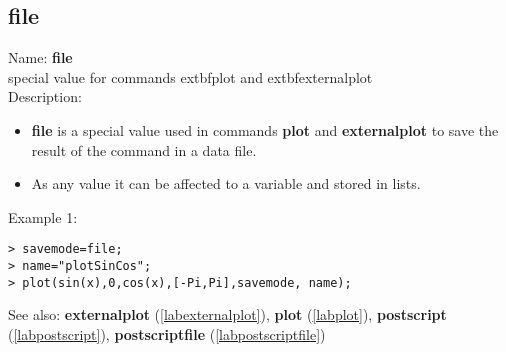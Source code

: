 \subsection{file}
\label{labfile}
\noindent Name: \textbf{file}\\
special value for commands 	extbf{plot} and 	extbf{externalplot}\\
\noindent Description: \begin{itemize}

\item \textbf{file} is a special value used in commands \textbf{plot} and \textbf{externalplot} to save
   the result of the command in a data file.

\item As any value it can be affected to a variable and stored in lists.
\end{itemize}
\noindent Example 1: 
\begin{center}\begin{minipage}{15cm}\begin{Verbatim}[frame=single]
> savemode=file;
> name="plotSinCos";
> plot(sin(x),0,cos(x),[-Pi,Pi],savemode, name);
\end{Verbatim}
\end{minipage}\end{center}
See also: \textbf{externalplot} (\ref{labexternalplot}), \textbf{plot} (\ref{labplot}), \textbf{postscript} (\ref{labpostscript}), \textbf{postscriptfile} (\ref{labpostscriptfile})
